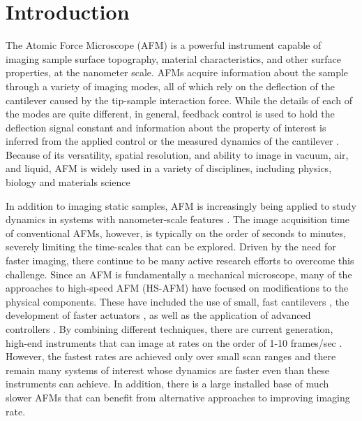 \documentclass[twocolumn,twoside]{IEEEtran/IEEEtran}
\begin{document}
\section{Introduction}\label{sec:introduction}
The Atomic Force Microscope (AFM) is a powerful instrument capable of imaging
sample surface topography, material characteristics, and other surface
properties, at the nanometer scale. AFMs acquire information about the sample
through a variety of imaging modes, all of which rely on the deflection of the
cantilever caused by the tip-sample interaction force. While the details of each
of the modes are quite different, in general, feedback control is used to hold
the deflection signal constant and information about the property of interest is
inferred from the applied control or the measured dynamics of the cantilever
\cite{Abramovitch:2007gt}. Because of its versatility, spatial resolution, and
ability to image in vacuum, air, and liquid, AFM is widely used in a variety of
disciplines, including physics, biology and materials science
\cite{Dufrene:2017gm,Yang:2017im,Payton:2016hj,Altman:2015ic,Haase:2015eh}
	
In addition to imaging static samples, AFM is increasingly being applied to
study dynamics in systems with nanometer-scale features
\cite{Yang:2017im,Shibata:2017da,Shibata:2015jd,Ando:2014ja}. The image
acquisition time of conventional AFMs, however, is typically on the order of
seconds to minutes, severely limiting the time-scales that can be explored.
Driven by the need for faster imaging, there continue to be many active research
efforts to overcome this challenge. Since an AFM is fundamentally a mechanical
microscope, many of the approaches to high-speed AFM (HS-AFM) have focused on
modifications to the physical components. These have included the use of small,
fast cantilevers \cite{viani1999fast, braunsmann2010high,Adams:2016hg}, the
development of faster actuators \cite{Maroufi:2015gt,Yong:2012kd,Kenton:2012cm},
as well as the application of advanced controllers
\cite{Rana:2018es,Yong:2015gr,butterworth2010adaptive,salapaka2002high}. By
combining different techniques, there are current generation, high-end
instruments that can image at rates on the order of 1-10 frames/sec
\cite{Ando:2014ja}. However, the fastest rates are achieved only over small scan
ranges and there remain many systems of interest whose dynamics are faster even
than these instruments can achieve. In addition, there is a large installed base
of much slower AFMs that can benefit from alternative approaches to improving
imaging rate.
	
\end{document}
